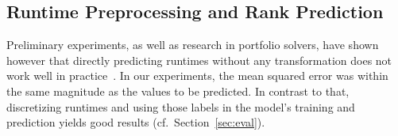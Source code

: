 \documentclass[runningheads]{llncs}
\begin{document}
\subsection{Runtime Preprocessing and Rank Prediction}
\label{sec:main1}


Preliminary experiments, as well as research in portfolio solvers, have shown however that directly predicting runtimes without any transformation does not work well in practice~\cite{NgokoCT19,CollauttiMMO13}.
In our experiments, the mean squared error was within the same magnitude as the values to be predicted.
In contrast to that, discretizing runtimes and using those labels in the model's training and prediction yields good results (cf.~Section~\ref{sec:eval}).
\end{document}
